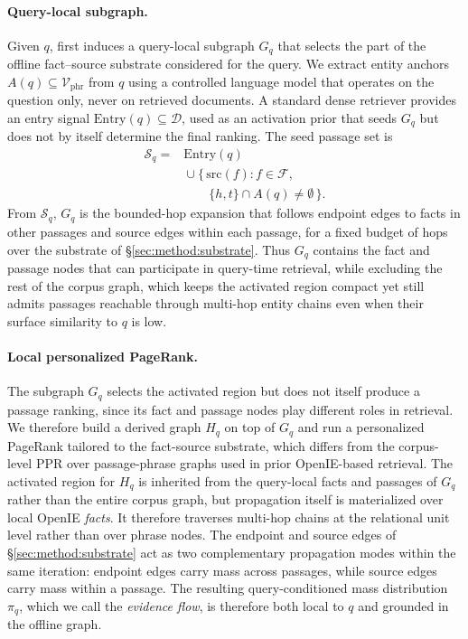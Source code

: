 \paragraph{Query-local subgraph.}
Given $q$, \methodname{} first induces a query-local subgraph $G_q$ that
selects the part of the offline fact--source substrate considered for
the query. We extract entity anchors
$A(q) \subseteq \mathcal{V}_{\mathrm{phr}}$ from $q$ using a controlled
language model that operates on the question only, never on retrieved
documents. A standard dense retriever provides an entry signal
$\mathrm{Entry}(q) \subseteq \mathcal{D}$, used as an activation prior
that seeds $G_q$ but does not by itself determine the final ranking.
The seed passage set is
\begin{equation}
\label{eq:gq-seed}
\begin{aligned}
\mathcal{S}_q
= {}& \mathrm{Entry}(q) \\
& {}\cup
\{\,\mathrm{src}(f) : f\in\mathcal{F},\\
&\qquad \{h,t\}\cap A(q)\neq\emptyset\,\}.
\end{aligned}
\end{equation}
From $\mathcal{S}_q$, $G_q$ is the bounded-hop expansion that follows
endpoint edges to facts in other passages and source edges within
each passage, for a fixed budget of hops over the substrate of
\S\ref{sec:method:substrate}. Thus $G_q$ contains the fact and passage
nodes that can participate in query-time retrieval, while excluding
the rest of the corpus graph, which keeps the activated region compact
yet still admits passages reachable through multi-hop entity chains
even when their surface similarity to $q$ is low.

\paragraph{Local personalized PageRank.}
The subgraph $G_q$ selects the activated region but does not itself
produce a passage ranking, since its fact and passage nodes play
different roles in retrieval. We therefore build a derived graph
$H_q$ on top of $G_q$ and run a personalized PageRank tailored to
the fact-source substrate, which differs from the corpus-level PPR
over passage-phrase graphs used in prior OpenIE-based retrieval.
The activated region for $H_q$ is inherited from the query-local facts
and passages of $G_q$ rather than the entire corpus graph, but
propagation itself is materialized over local OpenIE \emph{facts}. It therefore traverses
multi-hop chains at the relational unit level rather than over phrase
nodes. The endpoint and source edges of \S\ref{sec:method:substrate}
act as two complementary propagation modes within the same iteration:
endpoint edges carry mass across passages, while source edges carry
mass within a passage.
The resulting query-conditioned mass distribution $\pi_q$, which we
call the \emph{evidence flow}, is therefore both local to $q$ and
grounded in the offline graph.

